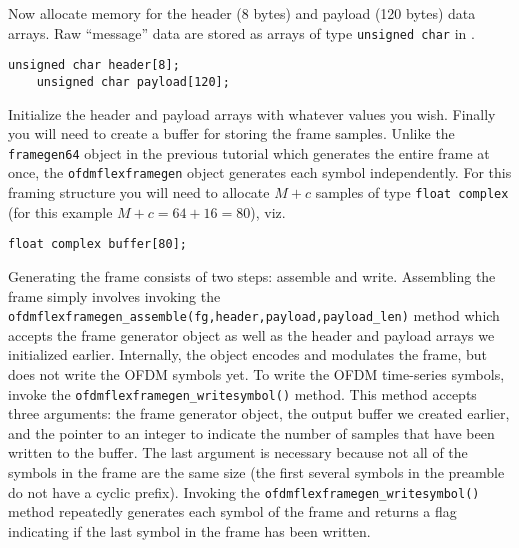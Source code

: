 Now allocate memory for the header (8 bytes) and payload (120 bytes)
data arrays.
Raw ``message'' data are stored as arrays of type {\tt unsigned char} in
\liquid.
%
\begin{Verbatim}[fontsize=\small]
    unsigned char header[8];
    unsigned char payload[120];
\end{Verbatim}
%
Initialize the header and payload arrays with whatever values you wish.
%
Finally you will need to create a buffer for storing the frame samples.
Unlike the {\tt framegen64} object in the previous tutorial which
generates the entire frame at once,
the {\tt ofdmflexframegen} object generates each symbol independently.
For this framing structure you will need to allocate $M+c$ samples of
type {\tt float complex} (for this example $M+c = 64+16 = 80$), viz.
%
\begin{Verbatim}[fontsize=\small]
    float complex buffer[80];
\end{Verbatim}
%
Generating the frame consists of two steps: assemble and write.
Assembling the frame simply involves invoking
the {\tt ofdmflexframegen\_assemble(fg,header,payload,payload\_len)}
method which accepts the frame generator object as well as the header
and payload arrays we initialized earlier.
Internally, the object encodes and modulates the frame, but does not
write the OFDM symbols yet.
To write the OFDM time-series symbols, invoke the
{\tt ofdmflexframegen\_writesymbol()}
method.
This method accepts three arguments:
  the frame generator object,
  the output buffer we created earlier,
  and the pointer to an integer to indicate the number of samples that
  have been written to the buffer.
The last argument is necessary because not all of the symbols in the
frame are the same size (the first several symbols in the preamble do
not have a cyclic prefix).
Invoking the {\tt ofdmflexframegen\_writesymbol()} method repeatedly
generates each symbol of the frame
and returns a flag indicating if the last symbol in the frame has been
written.

